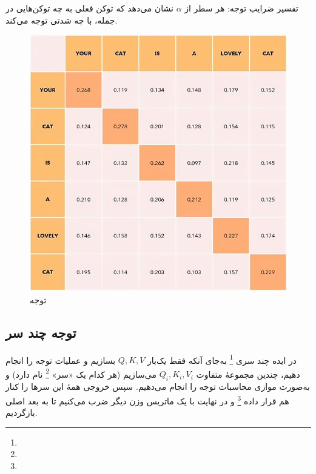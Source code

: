تفسیر ضرایب توجه: هر سطر از \( \alpha \) نشان می‌دهد که توکن فعلی به چه توکن‌هایی در جمله، با چه شدتی توجه می‌کند.



\begin{figure}[h]
	\centering
	\begin{minipage}[b]{0.6\textwidth}
		\centering
		\includegraphics[width=\textwidth]{transformer_images/multi_head_attention_new.png}
		\caption{توجه}
		\label{fig:attention}
	\end{minipage}
	\hfill
	
\end{figure}




\subsection{توجه چند سر}



در ایده چند سری \footnote{}  
به‌جای آنکه فقط یک‌بار \( Q, K, V \) بسازیم و عملیات توجه را انجام دهیم، چندین مجموعهٔ متفاوت \( Q_i, K_i, V_i \) می‌سازیم (هر کدام یک «سر» \footnote{} نام دارد) و به‌صورت موازی محاسبات توجه را انجام می‌دهیم. سپس خروجی همهٔ این سرها را کنار هم قرار داده \footnote{} و در نهایت با یک ماتریس وزن دیگر ضرب می‌کنیم تا به بعد اصلی بازگردیم.

